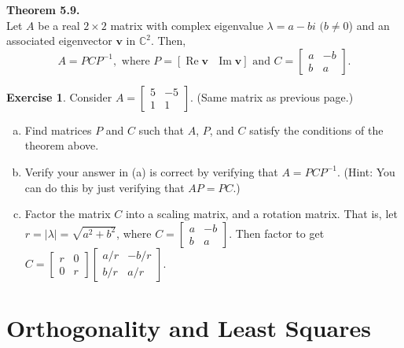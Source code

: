 \documentclass[10pt]{book}
\newcommand{\boxcolor}{gray!30}
\newenvironment{boxthm}{\begin{mdframed}[backgroundcolor=\boxcolor,nobreak=true]}{\end{mdframed}}
\theoremstyle{definition}
\newtheorem{exercise}{Exercise}[section]
\newcommand{\vect}[1]{\ensuremath{\boldsymbol{\mathbf{#1}}}}
\DeclareMathOperator{\re}{Re}
\DeclareMathOperator{\im}{Im}
\begin{document}
\newpage

\begin{boxthm}
	\textbf{Theorem 5.9.} \\
	Let $A$ be a real $2 \times 2$ matrix with complex eigenvalue $\lambda = a-bi$ $(b \ne 0$) and an associated eigenvector $\vect{v}$ in $\mathbb{C}^2$. Then, $$A = PCP^{-1}, \text{ where } P = [ \re \vect{v} \text{ } \im \vect{v} ] \text{ and } C = \begin{bmatrix}a&-b\\b&a \end{bmatrix}.$$
\end{boxthm}

\begin{exercise} 
	Consider $A  = \begin{bmatrix}5&-5\\1&1 \end{bmatrix}.$ (Same matrix as previous page.)
	\begin{enumerate}[(a)]
		\item Find matrices $P$ and $C$ such that $A$, $P$, and $C$ satisfy the conditions of the theorem above.
		\vfill
		\item Verify your answer in (a) is correct by verifying that $A = PCP^{-1}$. (Hint: You can do this by just verifying that $AP=PC$.)
		\vfill
		\item Factor the matrix $C$ into a scaling matrix, and a rotation matrix. That is, let $r = |\lambda| = \sqrt{a^2+b^2}$, where $ C = \begin{bmatrix}a&-b\\b&a \end{bmatrix}.$ Then factor to get $C = \begin{bmatrix}r&0\\0&r \end{bmatrix}\begin{bmatrix}a/r&-b/r\\b/r&a/r \end{bmatrix}.$
		\vfill
	\end{enumerate}
\end{exercise}

\newpage


\chapter{Orthogonality and Least Squares}
\setcounter{section}{0}
\end{document}
